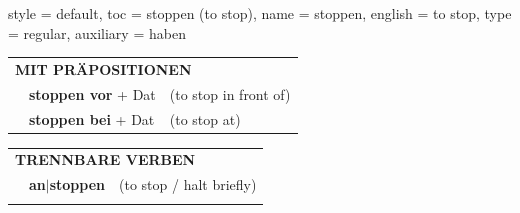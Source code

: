 \begin{verbentry}{
  style = {default},
  toc = {stoppen (to stop)},
  name = {stoppen},
  english = {to stop},
  type = {regular},
  auxiliary = {haben}
}
   \vspace{10pt}

   \begin{tabular}{lll}
      \multicolumn{3}{l}{\textbf{MIT PRÄPOSITIONEN}}\\
& \textbf{stoppen vor} + Dat & (to stop in front of)\\
& \textbf{stoppen bei} + Dat & (to stop at)\\
\end{tabular}
  \hfill
   \begin{tabular}{lll}
      \multicolumn{3}{l}{\textbf{TRENNBARE VERBEN}}\\
 & \textbf{an$|$stoppen} & (to stop / halt briefly)\\
\vspace{10pt}
  \end{tabular}

  \vspace{-5pt}
\end{verbentry}

